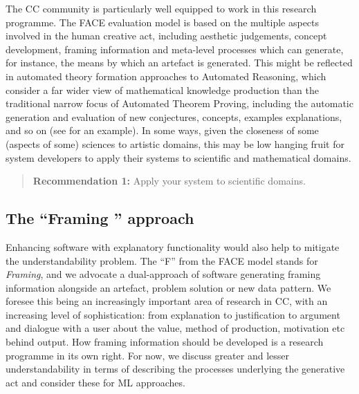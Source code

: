 \documentclass[letterpaper]{article}
\begin{document}
The CC community is particularly well equipped to work in this
research programme. The FACE evaluation model \cite{colton11} is
based on the multiple aspects involved in the human creative act,
including aesthetic judgements, concept development, framing
information and meta-level processes which can generate, for instance,
the means by which an artefact is generated. This might be reflected
in automated theory formation approaches to Automated Reasoning, which
consider a far wider view of mathematical knowledge production than
the traditional narrow focus of Automated Theorem Proving, including
the automatic generation and evaluation of new conjectures, concepts,
examples explanations, and so on (see \cite{atf-the-next-generation}
for an example). In some ways, given the closeness of some (aspects of
some) sciences to artistic domains, this may be low hanging fruit for
system developers to apply their systems to scientific and
mathematical domains. 


\begin{quote}
    {\bf Recommendation 1:} Apply your system to scientific domains.

\end{quote}

\subsection{The ``Framing '' approach} 
Enhancing software with explanatory functionality would also help to
mitigate the understandability problem. The ``F'' from the FACE model
stands for {\em Framing}, and we advocate a dual-approach of software
generating framing information alongside an artefact, problem solution
or new data pattern. We foresee this being an increasingly important
area of research in CC, with an increasing level of sophistication:
from explanation to justification to argument and dialogue with a user
about the value, method of production, motivation etc behind
output. How framing information should be developed is a research
programme in its own right. For now, we discuss greater and lesser
understandability in terms of describing the processes underlying the
generative act and consider these for ML approaches.
\end{document}
